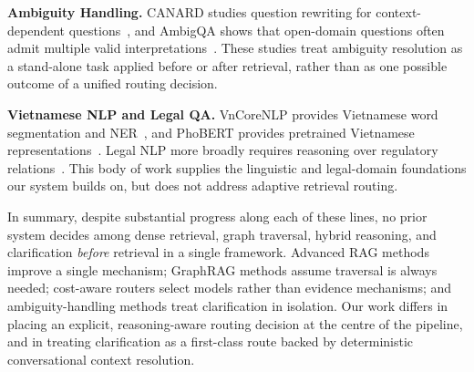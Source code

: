 \noindent\textbf{Ambiguity Handling.}
CANARD studies question rewriting for context-dependent
questions~\cite{elgohary2019canard}, and AmbigQA shows that open-domain
questions often admit multiple valid interpretations~\cite{min2020ambigqa}.
These studies treat ambiguity resolution as a stand-alone task applied before
or after retrieval, rather than as one possible outcome of a unified routing
decision.

\noindent\textbf{Vietnamese NLP and Legal QA.}
VnCoreNLP provides Vietnamese word segmentation and
NER~\cite{vu2018vncorenlp}, and PhoBERT provides pretrained Vietnamese
representations~\cite{nguyen2020phobert}. Legal NLP more broadly requires
reasoning over regulatory
relations~\cite{chalkidis2020legalbert,zhong2020nlp_law,guha2023legalbench,louis2024interpretable}.
This body of work supplies the linguistic and legal-domain foundations our
system builds on, but does not address adaptive retrieval routing.

In summary, despite substantial progress along each of these lines, no prior
system decides among dense retrieval, graph traversal, hybrid reasoning, and
clarification \emph{before} retrieval in a single framework. Advanced RAG
methods improve a single mechanism; GraphRAG methods assume traversal is
always needed; cost-aware routers select models rather than evidence
mechanisms; and ambiguity-handling methods treat clarification in isolation.
Our work differs in placing an explicit, reasoning-aware routing decision at
the centre of the pipeline, and in treating clarification as a first-class
route backed by deterministic conversational context resolution.

